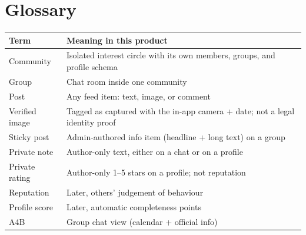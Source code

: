 \documentclass[11pt,a4paper]{article}
\begin{document}
\section{Glossary}
\begin{tabularx}{\textwidth}{@{}l Y@{}}
\toprule
\textbf{Term} & \textbf{Meaning in this product} \\
\midrule
Community & Isolated interest circle with its own members, groups, and profile schema \\
Group & Chat room inside one community \\
Post & Any feed item: text, image, or comment \\
Verified image & Tagged as captured with the in-app camera + date; not a legal identity proof \\
Sticky post & Admin-authored info item (headline + long text) on a group \\
Private note & Author-only text, either on a chat or on a profile \\
Private rating & Author-only 1--5 stars on a profile; not reputation \\
Reputation & Later, others' judgement of behaviour \\
Profile score & Later, automatic completeness points \\
A4B & Group chat view (calendar + official info) \\
\bottomrule
\end{tabularx}
\end{document}
